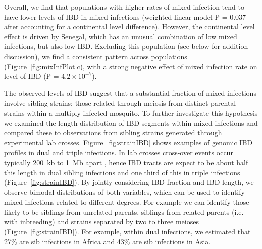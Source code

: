 \documentclass[9pt,lineno]{elife}
\begin{document}
Overall, we find that populations with higher rates of mixed infection tend to have lower levels of IBD in mixed infections (weighted linear model P = 0.037 after accounting for a continental level difference).  However, the continental level effect is driven by Senegal, which has an unusual combination of low mixed infections, but also low IBD.  Excluding this population (see below for addition discussion), we find a consistent pattern across populations (Figure~\ref{fig:mixInfPlot}c), with a strong negative effect of mixed infection rate on level of IBD (P = $4.2\times10^{-7}$).

The observed levels of IBD suggest that a substantial fraction of mixed infections involve sibling strains; those related through meiosis from distinct parental strains within a multiply-infected mosquito.  To further investigate this hypothesis we examined the length distribution of IBD segments within mixed infections and compared these to observations from sibling strains generated through experimental lab crosses.  Figure~\ref{fig:strainIBD} shows examples of genomic IBD profiles in dual and triple infections.  In lab crosses cross-over events occur typically 200~kb to 1~Mb apart \citet{Miles2016}, hence IBD tracts are expect to be about half this length in dual sibling infections and one third of this in triple infections (Figure~\ref{fig:strainIBD}).  By jointly considering IBD fraction and IBD length, we observe bimodal distributions of both variables, which can be used to identify mixed infections related to different degrees.  For example we can identify those likely to be siblings from unrelated parents, siblings from related parents (i.e. with inbreeding) and strains separated by two to three meioses (Figure~\ref{fig:strainIBD}).  For example, within dual infections, we estimated that 27\% are sib infections in Africa and 43\% are sib infections in Asia.
\end{document}
